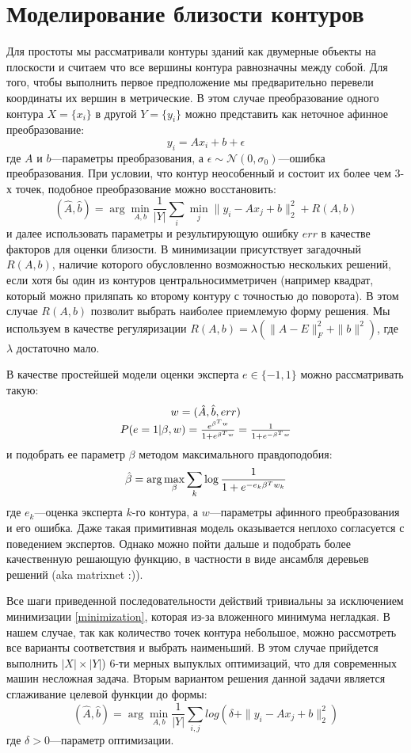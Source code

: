 \documentclass[12pt]{article}
\begin{document}
\section{Моделирование близости контуров}
\label{similarity}
Для простоты мы рассматривали контуры зданий как двумерные объекты на плоскости и считаем что все вершины контура равнозначны между собой. Для того, чтобы выполнить первое предположение мы предварительно перевели координаты их вершин в метрические. В этом случае преобразование одного контура $X = \{x_i\}$ в другой $Y = \{y_i\}$ можно представить как неточное афинное преобразование:
$$
y_i = A x_i + b + \epsilon
$$
где $A$ и $b$---параметры преобразования, а $\epsilon \sim \mathcal{N}(0, \sigma_0)$---ошибка преобразования. При условии, что контур неособенный и состоит их более чем 3-х точек, подобное преобразование можно восстановить:
\begin{equation}
\label{minimization}
(\hat{A},\hat{b})=\arg \min_{A, b} \frac{1}{|Y|}\sum_i \min_j \|y_i - A x_j + b\|^2_2 + R(A, b)
\end{equation}
и далее использовать параметры и результирующую ошибку $err$ в качестве факторов для оценки близости. В минимизации присутствует загадочный $R(A, b)$, наличие которого обусловленно возможностью нескольких решений, если хотя бы один из контуров центральносимметричен (например квадрат, который можно приляпать ко второму контуру с точностью до поворота). В этом случае $R(A,b)$ позволит выбрать наиболее приемлемую форму решения. Мы используем в качестве регуляризации $R(A, b) = \lambda\left(\|A - E\|_F^2 + \|b\|^2\right)$, где $\lambda$ достаточно мало.

В качестве простейшей модели оценки эксперта $e \in \{-1, 1\}$ можно рассматривать такую:
$$\begin{array}{c}
w = (\hat{A}, \hat{b}, err) \\
P(e = 1| \beta, w) = {e^{\beta^T w} \over 1 + e^{\beta^T w}} = {1 \over 1 + e^{-\beta^T w}}
\end{array}$$
и подобрать ее параметр $\beta$ методом максимального правдоподобия:
$$
\hat{\beta} = \arg \max_\beta \sum_k \log{1 \over 1 + e^{-e_k\beta^T w_k}}
$$
где $e_k$---оценка эксперта $k$-го контура, а $w$---параметры афинного преобразования и его ошибка. Даже такая примитивная модель оказывается неплохо согласуется с поведением экспертов. Однако можно пойти дальше и подобрать более качественную решающую функцию, в частности в виде ансамбля деревьев решений (aka matrixnet :)).

Все шаги приведенной последовательности действий тривиальны за исключением минимизации \ref{minimization}, которая из-за вложенного минимума негладкая. В нашем случае, так как количество точек контура небольшое, можно рассмотреть все варианты соответствия и выбрать наименьший. В этом случае прийдется выполнить $|X|\times|Y|$) 6-ти мерных выпуклых оптимизаций, что для современных машин несложная задача. Вторым вариантом решения данной задачи является сглаживание целевой функции до формы:
$$
(\hat{A},\hat{b})=\arg \min_{A, b} \frac{1}{|Y|}\sum_{i,j} log(\delta + \|y_i - A x_j + b\|^2_2)
$$
где $\delta >0$---параметр оптимизации.
\end{document}
